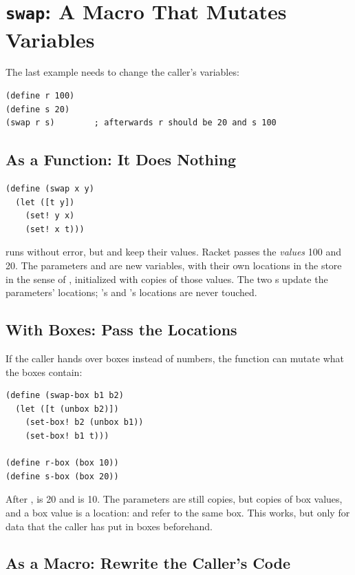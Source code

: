 \section{\texttt{swap}: A Macro That Mutates Variables}
\label{sec:swap}

The last example needs to change the caller's variables:
\begin{lstlisting}
(define r 100)
(define s 20)
(swap r s)        ; afterwards r should be 20 and s 100
\end{lstlisting}

\subsection{As a Function: It Does Nothing}

\begin{lstlisting}
(define (swap x y)
  (let ([t y])
    (set! y x)
    (set! x t)))
\end{lstlisting}
 runs without error, but  and  keep their values. Racket passes the \emph{values} 100 and 20. The parameters  and  are new variables, with their own locations in the store in the sense of , initialized with copies of those values. The two s update the parameters' locations; 's and 's locations are never touched.

\subsection{With Boxes: Pass the Locations}

If the caller hands over boxes instead of numbers, the function can mutate what the boxes contain:
\begin{lstlisting}
(define (swap-box b1 b2)
  (let ([t (unbox b2)])
    (set-box! b2 (unbox b1))
    (set-box! b1 t)))

(define r-box (box 10))
(define s-box (box 20))
\end{lstlisting}
After ,  is 20 and  is 10. The parameters are still copies, but copies of box values, and a box value is a location:  and  refer to the same box. This works, but only for data that the caller has put in boxes beforehand.

\subsection{As a Macro: Rewrite the Caller's Code}

